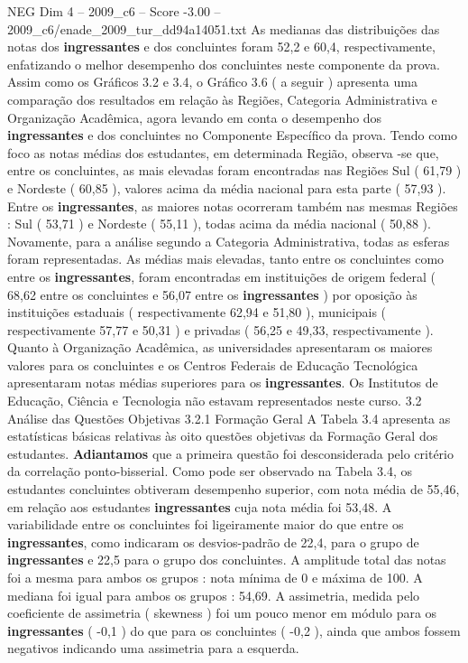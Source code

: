 \begin{textsample}{NEG Dim 4 – 2009\_c6 – Score -3.00 – 2009\_c6/enade\_2009\_tur\_dd94a14051.txt}
As medianas das distribuições das notas dos \textbf{ingressantes} e dos concluintes foram 52,2 e 60,4, respectivamente, enfatizando o melhor desempenho dos concluintes neste componente da prova.
Assim como os Gráficos 3.2 e 3.4, o Gráfico 3.6 ( a seguir ) apresenta uma comparação dos resultados em relação às Regiões, Categoria Administrativa e Organização Acadêmica, agora levando em conta o desempenho dos \textbf{ingressantes} e dos concluintes no Componente Específico da prova.
Tendo como foco as notas médias dos estudantes, em determinada Região, observa -se que, entre os concluintes, as mais elevadas foram encontradas nas Regiões Sul ( 61,79 ) e Nordeste ( 60,85 ), valores acima da média nacional para esta parte ( 57,93 ).
Entre os \textbf{ingressantes}, as maiores notas ocorreram também nas mesmas Regiões : Sul ( 53,71 ) e Nordeste ( 55,11 ), todas acima da média nacional ( 50,88 ).
Novamente, para a análise segundo a Categoria Administrativa, todas as esferas foram representadas.
As médias mais elevadas, tanto entre os concluintes como entre os \textbf{ingressantes}, foram encontradas em instituições de origem federal ( 68,62 entre os concluintes e 56,07 entre os \textbf{ingressantes} ) por oposição às instituições estaduais ( respectivamente 62,94 e 51,80 ), municipais ( respectivamente 57,77 e 50,31 ) e privadas ( 56,25 e 49,33, respectivamente ).
Quanto à Organização Acadêmica, as universidades apresentaram os maiores valores para os concluintes e os Centros Federais de Educação Tecnológica apresentaram notas médias superiores para os \textbf{ingressantes}.
Os Institutos de Educação, Ciência e Tecnologia não estavam representados neste curso. 3.2 Análise das Questões Objetivas 3.2.1 Formação Geral A Tabela 3.4 apresenta as estatísticas básicas relativas às oito questões objetivas da Formação Geral dos estudantes. \textbf{Adiantamos} que a primeira questão foi desconsiderada pelo critério da correlação ponto-bisserial.
Como pode ser observado na Tabela 3.4, os estudantes concluintes obtiveram desempenho superior, com nota média de 55,46, em relação aos estudantes \textbf{ingressantes} cuja nota média foi 53,48.
A variabilidade entre os concluintes foi ligeiramente maior do que entre os \textbf{ingressantes}, como indicaram os desvios-padrão de 22,4, para o grupo de \textbf{ingressantes} e 22,5 para o grupo dos concluintes.
A amplitude total das notas foi a mesma para ambos os grupos : nota mínima de 0 e máxima de 100.
A mediana foi igual para ambos os grupos : 54,69.
A assimetria, medida pelo coeficiente de assimetria ( skewness ) foi um pouco menor em módulo para os \textbf{ingressantes} ( -0,1 ) do que para os concluintes ( -0,2 ), ainda que ambos fossem negativos indicando uma assimetria para a esquerda.

\end{textsample}

